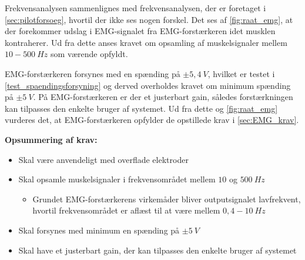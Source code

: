 \noindent
Frekvensanalysen sammenlignes med frekvensanalysen, der er foretaget i \autoref{sec:pilotforsoeg}, hvortil der ikke ses nogen forskel. 
Det ses af \autoref{fig:raat_emg}, at der forekommer udslag i EMG-signalet fra EMG-forstærkeren idet musklen kontraherer. Ud fra dette anses kravet om opsamling af muskelsignaler mellem $10-500~Hz$ som værende opfyldt. 

EMG-forstærkeren forsynes med en spænding på $\pm 5,4~V$, hvilket er testet i \autoref{test_spaendingsforsyning} og derved overholdes kravet om minimum spænding på $\pm 5~V$.
På EMG-forstærkeren er der et justerbart gain, således forstærkningen kan tilpasses den enkelte bruger af systemet. Ud fra dette og \autoref{fig:raat_emg} vurderes det, at EMG-forstærkeren opfylder de opstillede krav i \autoref{sec:EMG_krav}.

\vspace{3mm}
\textbf{Opsummering af krav:}
\begin{itemize}
\item[\text{\sffamily \checkmark}] Skal være anvendeligt med overflade elektroder
\item[\text{\sffamily $\div$}] Skal opsamle muskelsignaler i frekvensområdet mellem $10$ og $500~Hz$
\begin{itemize}
\item[\text{\sffamily \checkmark}] Grundet EMG-forstærkerens virkemåder bliver outputsignalet lavfrekvent, hvortil frekvensområdet er aflæst til at være mellem $0,4-10~Hz$
\end{itemize}
\item[\text{\sffamily \checkmark}] Skal forsynes med minimum en spænding på $\pm5~V$
\item[\text{\sffamily \checkmark}] Skal have et justerbart gain, der kan tilpasses den enkelte bruger af systemet
\end{itemize}


